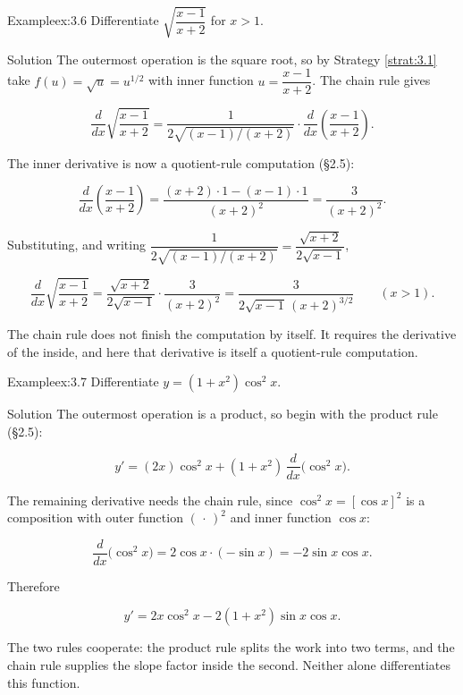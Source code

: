 \documentclass[a4paper,12pt,oneside]{memoir}
\begin{document}
\begin{workedexample}
\begin{envexample}{Example}{ex:3.6}{}
Differentiate \(\sqrt{\dfrac{x - 1}{x + 2}}\) for \(x > 1\).
\end{envexample}
\begin{envsolution}{Solution}{}{}
The outermost operation is the square root, so by Strategy \ref{strat:3.1} take \(f(u) = \sqrt{u} = u^{1/2}\) with inner function \(u = \dfrac{x - 1}{x + 2}\). The chain rule gives

\[ \frac{d}{dx}\sqrt{\frac{x - 1}{x + 2}} = \frac{1}{2\sqrt{(x - 1)/(x + 2)}}\cdot\frac{d}{dx}\!\left(\frac{x - 1}{x + 2}\right). \]

The inner derivative is now a quotient-rule computation (§2.5):

\[ \frac{d}{dx}\!\left(\frac{x - 1}{x + 2}\right) = \frac{(x + 2)\cdot 1 - (x - 1)\cdot 1}{(x + 2)^{2}} = \frac{3}{(x + 2)^{2}}. \]

Substituting, and writing \(\dfrac{1}{2\sqrt{(x - 1)/(x + 2)}} = \dfrac{\sqrt{x + 2}}{2\sqrt{x - 1}}\),

\[ \frac{d}{dx}\sqrt{\frac{x - 1}{x + 2}} = \frac{\sqrt{x + 2}}{2\sqrt{x - 1}}\cdot\frac{3}{(x + 2)^{2}} = \frac{3}{2\sqrt{x - 1}\,(x + 2)^{3/2}} \qquad (x > 1). \]

The chain rule does not finish the computation by itself. It requires the derivative of the inside, and here that derivative is itself a quotient-rule computation.
\end{envsolution}
\end{workedexample}
\begin{workedexample}
\begin{envexample}{Example}{ex:3.7}{}
Differentiate \(y = (1 + x^{2})\cos^{2} x\).
\end{envexample}
\begin{envsolution}{Solution}{}{}
The outermost operation is a product, so begin with the product rule (§2.5):

\[ y' = (2x)\cos^{2} x + (1 + x^{2})\,\frac{d}{dx}\bigl(\cos^{2} x\bigr). \]

The remaining derivative needs the chain rule, since \(\cos^{2} x = [\cos x]^{2}\) is a composition with outer function \((\,\cdot\,)^{2}\) and inner function \(\cos x\):

\[ \frac{d}{dx}\bigl(\cos^{2} x\bigr) = 2\cos x\cdot(-\sin x) = -2\sin x\cos x. \]

Therefore

\[ y' = 2x\cos^{2} x - 2(1 + x^{2})\sin x\cos x. \]

The two rules cooperate: the product rule splits the work into two terms, and the chain rule supplies the slope factor inside the second. Neither alone differentiates this function.
\end{envsolution}
\end{workedexample}
\end{document}
